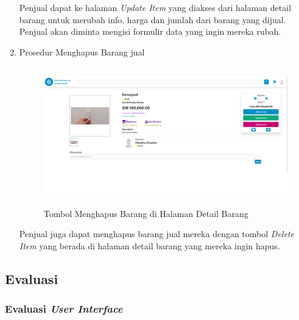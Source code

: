 \documentclass[a4paper]{article}
\newcommand{\subbab}[1]{%
    \subsection{#1}%
    \setcounter{figure}{0}
    \setcounter{table}{0}
}
\newcommand{\subsubbab}[1]{%
    \subsubsection{#1}%
}
\begin{document}
\begin{enumerate}
Penjual dapat ke halaman \textit{Update Item} yang diakses dari halaman detail barang untuk merubah info, harga dan jumlah dari barang yang dijual. Penjual akan diminta mengisi formulir data yang ingin mereka rubah.

\newpage
\item Prosedur Menghapus Barang jual

\begin{figure}[h]
    \centering
    \includegraphics*[height=6cm]{images/prosedur pengunaan aplikasi/Merchant/Delete Item.png}
    \caption{Tombol Menghapus Barang di Halaman Detail Barang}
\end{figure}

Penjual juga dapat menghapus barang jual mereka dengan tombol \textit{Delete Item} yang berada di halaman detail barang yang mereka ingin hapus.

\end{enumerate}

\newpage
\subbab{Evaluasi}
\subsubbab{Evaluasi \textit{User Interface}}
\end{document}
